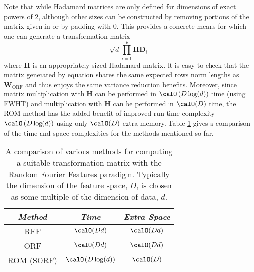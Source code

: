 Note that while Hadamard matrices are only defined for dimensions of exact powers of 2, although other sizes can be constructed by removing portions of the matrix given in  or by padding with $0$. This provides a concrete means for which one can generate a transformation matrix
\begin{equation} \label{eq: ROM-Hadamard}
    \sqrt{d} \prod_{i=1}^{k} \bm{H} \bm{D}_{i}
\end{equation}
where $\bm{H}$ is an appropriately sized Hadamard matrix. It is easy to check that the matrix generated by equation   shares the same expected rows norm lengths as $\bm{W}_{\text{ORF}}$ and thus enjoys the same variance reduction benefits. Moreover, since matrix multiplication with $\bm{H}$ can be performed in $\calO \left( D \log (d) \right)$ time (using FWHT) and multiplication with $\bm{H}$ can be performed in $\calO (D)$ time, the ROM method has the added benefit of improved run time complexity $\calO \left( D \log (d) \right)$ using only $\calO (D)$ extra memory. Table \ref{table: RFF-compare} gives a comparison of the time and space complexities for the methods mentioned so far.

\begin{table}[h!]
    \centering
    \caption{A comparison of various methods for computing a suitable transformation matrix with the Random Fourier Features paradigm. Typically the dimension of the feature space, $D$, is chosen as some multiple of the dimension of data, $d$.}
    \label{table: RFF-compare}
    \begin{tabular}{*3c}                                                                                                                    \\\bottomrule
        \hline
        \emph{Method}                                                  & \emph{Time}                       & \emph{Extra Space } \\\midrule
        RFF \cite{NIPS2007_013a006f}                                   & $\calO (Dd)$                      & $\calO (Dd)$        \\
        ORF \cite{YuFelixX2016ORF}                                     & $\calO (Dd)$                      & $\calO (Dd)$        \\
        ROM (SORF) \cite{ChoromanskiKrzysztof2017TUEo,YuFelixX2016ORF} & $\calO \left( D \log (d) \right)$ & $\calO (D)$         \\\bottomrule
        \hline
    \end{tabular}
\end{table}

